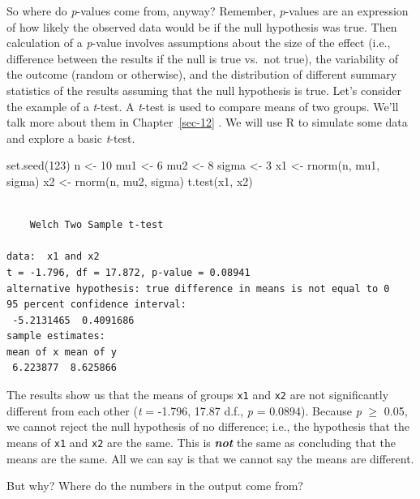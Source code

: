 \documentclass[
  13,
  letterpaper,
]{report}
\newenvironment{Shaded}{\begin{snugshade}}{\end{snugshade}}
\newcommand{\DecValTok}[1]{\textcolor[rgb]{0.68,0.00,0.00}{#1}}
\newcommand{\FunctionTok}[1]{\textcolor[rgb]{0.28,0.35,0.67}{#1}}
\newcommand{\NormalTok}[1]{\textcolor[rgb]{0.00,0.23,0.31}{#1}}
\newcommand{\OtherTok}[1]{\textcolor[rgb]{0.00,0.23,0.31}{#1}}
\begin{document}
So where do \emph{p}-values come from, anyway? Remember, \emph{p}-values
are an expression of how likely the observed data would be if the null
hypothesis was true. Then calculation of a \emph{p}-value involves
assumptions about the size of the effect (i.e., difference between the
results if the null is true vs.~not true), the variability of the
outcome (random or otherwise), and the distribution of different summary
statistics of the results assuming that the null hypothesis is true.
Let's consider the example of a \emph{t}-test. A \emph{t}-test is used
to compare means of two groups. We'll talk more about them in
Chapter~\ref{sec-12} . We will use R to simulate some data and explore a
basic \emph{t}-test.

\begin{Shaded}
\begin{Highlighting}[]
\FunctionTok{set.seed}\NormalTok{(}\DecValTok{123}\NormalTok{)}
\NormalTok{n }\OtherTok{\textless{}{-}} \DecValTok{10}
\NormalTok{mu1 }\OtherTok{\textless{}{-}} \DecValTok{6}
\NormalTok{mu2 }\OtherTok{\textless{}{-}} \DecValTok{8}
\NormalTok{sigma }\OtherTok{\textless{}{-}} \DecValTok{3}
\NormalTok{x1 }\OtherTok{\textless{}{-}} \FunctionTok{rnorm}\NormalTok{(n, mu1, sigma)}
\NormalTok{x2 }\OtherTok{\textless{}{-}} \FunctionTok{rnorm}\NormalTok{(n, mu2, sigma)}
\FunctionTok{t.test}\NormalTok{(x1, x2)}
\end{Highlighting}
\end{Shaded}

\begin{verbatim}

    Welch Two Sample t-test

data:  x1 and x2
t = -1.796, df = 17.872, p-value = 0.08941
alternative hypothesis: true difference in means is not equal to 0
95 percent confidence interval:
 -5.2131465  0.4091686
sample estimates:
mean of x mean of y 
 6.223877  8.625866 
\end{verbatim}

The results show us that the means of groups \texttt{x1} and \texttt{x2}
are not significantly different from each other (\emph{t} = -1.796,
17.87 d.f., \emph{p} = 0.0894). Because \emph{p} \(\ge\) 0.05, we cannot
reject the null hypothesis of no difference; i.e., the hypothesis that
the means of \texttt{x1} and \texttt{x2} are the same. This is
\textbf{\emph{not}} the same as concluding that the means are the same.
All we can say is that we cannot say the means are different.

But why? Where do the numbers in the output come from?
\end{document}
